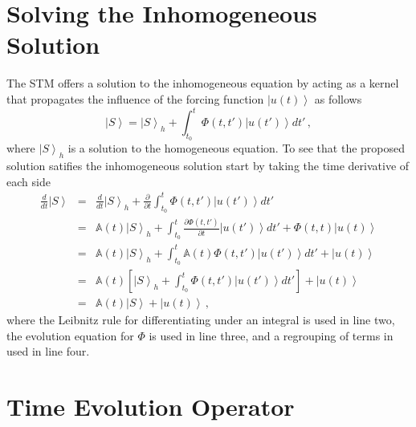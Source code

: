 \documentclass[10pt]{article}
\begin{document}
\section{Solving the Inhomogeneous Solution}

The STM offers a solution to the inhomogeneous equation by acting as a kernel
that propagates the influence of the forcing function $\left| u(t) \right>$
as follows
\[
 \left| S \right> = \left| S \right>_h + \int_{t_0}^t \Phi(t,t') \left| u(t') \right> dt' \, ,
\]
where $\left| S \right>_h$ is a solution to the homogeneous equation.
To see that the proposed solution satifies the inhomogeneous solution
start by taking the time derivative of each side
\begin{eqnarray*}
  \frac{d}{dt} \left| S \right> & = &  \frac{d}{dt} \left| S \right>_h + \frac{\partial}{\partial t} \int_{t_0}^t \Phi(t,t') \left|u(t')\right> dt' \\
                                & = &  {\mathbb A}(t) \left| S \right>_h + \int_{t_0}^t \frac{\partial \Phi(t,t')}{\partial t} \left| u(t')\right> dt'
                                       + \Phi(t,t) \left| u(t) \right> \\
                                & = & {\mathbb A}(t) \left| S \right>_h + \int_{t_0}^t {\mathbb A}(t) \Phi(t,t') \left| u(t') \right> dt' 
                                       + \left| u(t) \right>\\
                                & = & {\mathbb A}(t) \left[ \left| S\right>_h + \int_{t_0}^t \Phi(t,t') \left| u(t') \right> dt' \right]
                                       + \left| u(t) \right> \\
                                & = & {\mathbb A}(t) \left|S\right> + \left|u(t)\right> \, ,
\end{eqnarray*}
where the Leibnitz rule for differentiating under an integral is used in line 
two, the evolution equation for $\Phi$ is used in line three, and a regrouping
of terms in used in line four.

\section{Time Evolution Operator}
\end{document}
